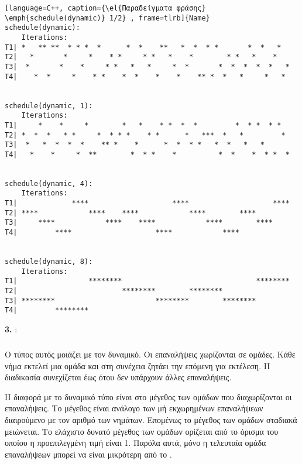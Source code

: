 \begin{lstlisting}[language=C++, caption={\el{Παραδείγματα φράσης} \emph{schedule(dynamic)} 1/2} , frame=tlrb]{Name}
schedule(dynamic):
    Iterations:       
T1| *   ** **  * * *  *      *  *    **   *  *  * *       *  *   *  
T2|   *       *     *    * *     * *   *    *        * *   *    *   
T3|  *       *    *     * *   *   *     *  *       *  *  *  *  *   *    
T4|    *  *     *    * *    *  *    *    *    ** *  *   *     *   *                 


schedule(dynamic, 1): 
    Iterations:
T1|     *    *     *        *   *    * *  *  *         *  * *  * *  
T2| *  *  *   * *     *  * * *    * *      *   ***  *   *         * 
T3|  *   *  *  *  *    ** *    *      *  *  * *   *  *   *   *  
T4|   *    *     *  **        *  * *    *          *  *    *  * *  *


schedule(dynamic, 4):   
    Iterations:
T1|             ****                    ****                    ****
T2| ****            ****    ****            ****        ****        
T3|     ****            ****    ****            ****        ****    
T4|         ****                    ****            ****             


schedule(dynamic, 8):   
    Iterations:
T1|                 ********                                ********
T2|                         ********        ********                
T3| ********                        ********        ********        
T4|         ********                                                
\end{lstlisting}

\clearpage
\textbf{3. }: 
\subparagraph{}
Ο τύπος αυτός μοιάζει με τον δυναμικό. Οι επαναλήψεις χωρίζονται σε ομάδες. Κάθε νήμα εκτελεί μια ομάδα και στη συνέχεια ζητάει την επόμενη για εκτέλεση. Η διαδικασία συνεχίζεται έως ότου δεν υπάρχουν άλλες επαναλήψεις.

Η διαφορά με το δυναμικό τύπο είναι στο μέγεθος των ομάδων που διαχωρίζονται οι επαναλήψεις. Το μέγεθος είναι ανάλογο των μή εκχωρημένων επαναλήψεων διαιρούμενο με τον αριθμό των νημάτων. Επομένως το μέγεθος των ομάδων σταδιακά μειώνεται. Το ελάχιστο δυνατό μέγεθος των ομάδων ορίζεται από το όρισμα \emph{} του οποίου η προεπιλεγμένη τιμή είναι 1. Παρόλα αυτά, μόνο η τελευταία ομάδα επαναλήψεων μπορεί να είναι μικρότερη από το \emph{}.

